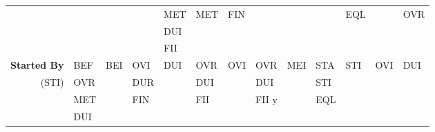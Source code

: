 \documentclass[11pt]{report}
\newenvironment{vvarmargin}[2]
{
  \begin{list}{}
  {
    \setlength{\topsep}{0pt}
    \setlength{\leftmargin}{0pt}
    \setlength{\rightmargin}{0pt}
    \setlength{\listparindent}{\parindent}
    \setlength{\itemindent}{\parindent}
    \setlength{\parsep}{0pt plus 1pt}
    \addtolength{\leftmargin}{#1}\addtolength{\rightmargin}{#2}
  }
  \item
}
{
  \end{list}
}
\begin{document}
\begin{table}[p]
\begin{vvarmargin}{-4cm}{-4cm}
\begin{center}
\begin{tabular}[t]{|r|l|l|l|l|l|l|l|l|l|l|l|l|}
                                          &                         &                         &                         & MET                     & MET                     & FIN                     &                         &                         &                         & EQL                     &                         & OVR                     \\
                                          &                         &                         &                         & DUI                     &                         &                         &                         &                         &                         &                         &                         &                         \\
                                          &                         &                         &                         & FII                     &                         &                         &                         &                         &                         &                         &                         &                         \\
                  \hline
                  \textbf{Started By}     & BEF                     & BEI                     & OVI                     & DUI                     & OVR                     & OVI                     & OVR                     & MEI                     & STA                     & STI                     & OVI                     & DUI                     \\
                  (STI)                   & OVR                     &                         & DUR                     &                         & DUI                     &                         & DUI                     &                         & STI                     &                         &                         &                         \\
                                          & MET                     &                         & FIN                     &                         & FII                     &                         & FII       y             &                         & EQL                     &                         &                         &                         \\
                                          & DUI                     &                         &                         &                         &                         &                         &                         &                         &                         &                         &                         &                         \\

\end{tabular}
\end{center}
\end{vvarmargin}
\end{table}
\end{document}
